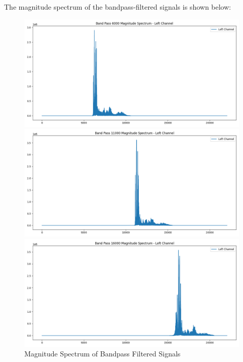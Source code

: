 \documentclass[12pt,a4paper]{article}
\begin{document}
The magnitude spectrum of the bandpass-filtered signals is shown below:
\begin{figure}[H]
    \centering
    \begin{minipage}{0.29\textwidth}
        \centering
        \includegraphics[width=\textwidth]{../data/demodulated/separated_spectrums/band_pass_6000_magnitude_spectrum.png}
    \end{minipage} \hfill
    \begin{minipage}{0.29\textwidth}
        \centering
        \includegraphics[width=\textwidth]{../data/demodulated/separated_spectrums/band_pass_11000_magnitude_spectrum.png}
    \end{minipage} \hfill
    \begin{minipage}{0.29\textwidth}
        \centering
        \includegraphics[width=\textwidth]{../data/demodulated/separated_spectrums/band_pass_16000_magnitude_spectrum.png}
    \end{minipage}
    \caption{Magnitude Spectrum of Bandpass Filtered Signals}
\end{figure}
\end{document}
